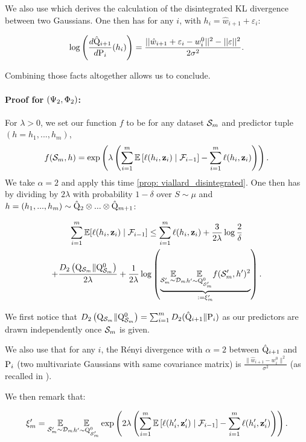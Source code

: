 \begin{noaddcontents}
We also use \cite[Lemma 11]{viallard2023general} which derives the calculation of the disintegrated KL divergence between two Gaussians. One then has for any $i$, with $h_i= \hat{w}_{i+1} + \varepsilon_i$:

\[ \log\left(\frac{d\hat{\Q}_{i+1}}{d\P_{i}}(h_i)\right) = \frac{||\hat{w}_{i+1} + \varepsilon_i- w_i^0||^2 - ||\varepsilon||^2}{2\sigma^2}. \]

Combining those facts altogether allows us to conclude.


\paragraph{Proof for  $(\Psi_{\normalfont2},\Phi_{\normalfont2})$:}

For $\lambda>0$, we set our function $f$ to be for any dataset $\Sm$ and predictor tuple $(h=h_1,...,h_m)$,
\[f(\Sm,h) = \exp\left(\lambda \left(\sum_{i=1}^m \mathbb{E}\left[\ell(h_i,\z_i)\mid \mathcal{F}_{i-1}\right]- \sum_{i=1}^m \ell(h_i,\z_i) \right) \right).\]
We take $\alpha=2$ and apply this time \cref{prop: viallard_disintegrated}.
One then has by dividing by $2\lambda$ with probability $1-\delta$ over $S\sim \mu$ and $h=(h_1,...,h_m)\sim \hat{\Q}_2\otimes ... \otimes \hat{\Q}_{m+1}$:

\begin{multline*}\sum_{i=1}^m  \mathbb{E}[\ell(h_i,\z_i) \mid \mathcal{F}_{i-1}]   \leq \sum_{i=1}^m  \ell(h_i,\z_i)+   \frac{3}{2\lambda}\log \frac{2}{\delta}\\
  +\frac{D_{2}\left(\Q_{\Sm} \| \Q_{\Sm}^0\right)}{2\lambda}+ \frac{1}{2\lambda}
\log \left(\underbrace{\underset{\Sm^{\prime} \sim \Dm}{\mathbb{E}} \underset{h^{\prime} \sim \Q_{\Sm'}^0}{\mathbb{E}}
f(\Sm',h')^{2}}_{:= \xi_m'}\right). 
\end{multline*}

We first notice that $D_{2}\left(\Q_{\Sm} \| \Q_{\Sm}^0\right) = \sum_{i=1}^m D_2(\hat{\Q}_{i+1}\| \P_{i})$ as our predictors are drawn independently once $\Sm$ is given.

We also use that for any $i$, the Rényi divergence with $\alpha=2$ between $\hat{\Q}_{i+1}$ and $\P_{i}$ (two multivariate Gaussians with same covariance matrix) is $\frac{\|\hat{w}_{i+1}- w_i^0\|^2}{\sigma^2}$ (as recalled in \cite{gil2013renyi}).

We then remark that:

\[ \xi'_m = \underset{\Sm^{\prime} \sim \Dm}{\mathbb{E}} \underset{h^{\prime} \sim \Q_{\Sm'}^0}{\mathbb{E}}
\exp\left(2\lambda \left(\sum_{i=1}^m \mathbb{E}\left[\ell(h_i',\z_i')\mid \mathcal{F}_{i-1}\right]- \sum_{i=1}^m \ell(h_i',\z_i') \right)\right).  \]


\end{noaddcontents}
